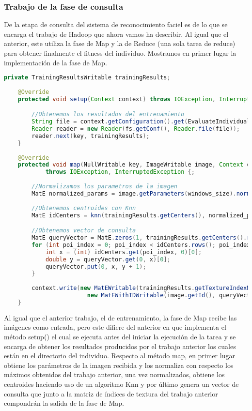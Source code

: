 \subsubsection{Trabajo de la fase de consulta}

De la etapa de consulta del sistema de reconocimiento faciel es de lo que se encarga el trabajo de Hadoop que ahora vamos ha describir. Al igual que el anterior, este utiliza la fase de Map y la de Reduce (una sola tarea de reduce) para obtener finalmente el fitness del individuo. Mostramos en primer lugar la implementación de la fase de Map.

 \begin{lstlisting}[language=Java]
 	private TrainingResultsWritable trainingResults;
 
	@Override
	protected void setup(Context context) throws IOException, InterruptedException {

		//Obtenemos los resultados del entrenamiento
		String file = context.getConfiguration().get(EvaluateIndividual.INDIVIDUAL_DIR_PARAM).concat("training/part-r-00000");
		Reader reader = new Reader(fs.getConf(), Reader.file(file));
		reader.next(key, trainingResults);
	}
	
	@Override
	protected void map(NullWritable key, ImageWritable image, Context context)
			throws IOException, InterruptedException {;
		
		//Normalizamos los parametros de la imagen
		MatE normalized_params = image.getParameters(windows_size).normalize(trainingResults.getMaxPerCol());
		
		//Obtenemos centroides con Knn
		MatE idCenters = knn(trainingResults.getCenters(), normalized_params);

		//Obtenemos vector de consulta		
		MatE queryVector = MatE.zeros(1, trainingResults.getCenters().rows(), CvType.CV_64F);
		for (int poi_index = 0; poi_index < idCenters.rows(); poi_index++) {
			int x = (int) idCenters.get(poi_index, 0)[0];
			double y = queryVector.get(0, x)[0];
			queryVector.put(0, x, y + 1);
		}
		
		context.write(new MatEWritable(trainingResults.getTextureIndexMatrix()), 
						new MatEWithIDWritable(image.getId(), queryVector));
	}
\end{lstlisting}

Al igual que el anterior trabajo, el de entrenamiento, la fase de Map recibe las imágenes como entrada, pero este difiere del anterior en que implementa el método setup() el cual se ejecuta antes del iniciar la ejecución de la tarea y se encarga de obtener los resultados producidos por el trabajo anterior los cuales están en el directorio del individuo. Respecto al método map, en primer lugar obtiene los parámetros de la imagen recibida y los normaliza con respecto los máximos obtenidos del trabajo anterior, una vez normalizados, obtiene los centroides haciendo uso de un algoritmo Knn y por \'ultimo genera un vector de consulta que junto a la matriz de \'indices de textura del trabajo anterior compondrán la salida de la fase de Map.


